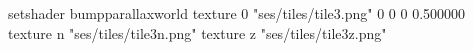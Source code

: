 setshader bumpparallaxworld
texture 0 "ses/tiles/tile3.png" 0 0 0 0.500000
texture n "ses/tiles/tile3n.png"
texture z "ses/tiles/tile3z.png"

